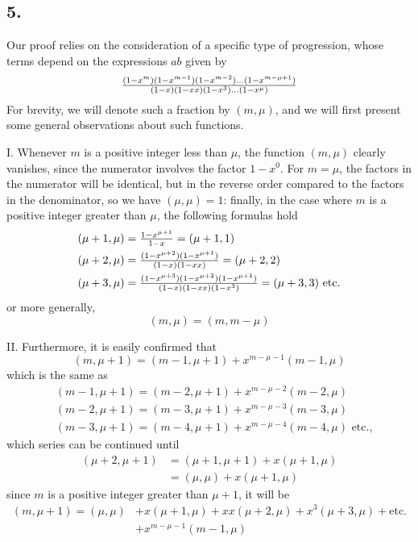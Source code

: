 \documentclass[twoside,12pt, showframe]{memoir}
\let\oldfrac\frac
\def\frac#1#2{\mathchoice{\tfrac{#1}{#2}}{\oldfrac{#1}{#2}}{\genfrac{}{}{}{2}{#1}{#2\mathstrut}}{\genfrac{}{}{}{3}{#1}{#2\mathstrut}}}
\begin{document}
\subsection*{5.}

Our proof relies on the consideration of a specific type of progression, whose terms depend on the expressions \(a b\) given by
\[\frac{(1-x^{m})(1-x^{m-1})(1-x^{m-2}) \ldots(1-x^{m-\mu+1})}{(1-x)(1-x x)(1-x^{3}) \ldots (1-x^{\mu})}\]
For brevity, we will denote such a fraction by \((m, \mu)\), and we will first present some general observations about such functions.
%

I. Whenever \(m\) is a positive integer less than \(\mu\), the function \((m, \mu)\) clearly vanishes, since the numerator involves the factor \(1-x^{0}\). For \(m = \mu\), the factors in the numerator will be identical, but in the reverse order compared to the factors in the denominator, so we have \((\mu, \mu) = 1\): finally, in the case where \(m\) is a positive integer greater than \(\mu\), the following formulas hold
\[\begin{aligned}
& (\mu+1, \mu) = \frac{1-x^{\mu+1}}{1-x} = (\mu+1,1) \\
& (\mu+2, \mu) = \frac{(1-x^{\mu+2})(1-x^{\mu+1})}{(1-x)(1-x x)} = (\mu+2,2) \\
& (\mu+3, \mu) = \frac{(1-x^{\mu+3})(1-x^{\mu+2})(1-x^{\mu+1})}{(1-x)(1-xx)(1-x^{3})} = (\mu+3,3) \text{ etc.}
\end{aligned}\]\clearpage\noindent%
or more generally,
\[(m, \mu) = (m, m-\mu)\]
%

II. Furthermore, it is easily confirmed that
\[(m, \mu+1)=(m-1, \mu+1)+x^{m-\mu-1}(m-1, \mu)\]
which is the same as
\[\begin{aligned}
& (m-1, \mu+1)=(m-2, \mu+1)+x^{m-\mu-2}(m-2, \mu) \\
& (m-2, \mu+1)=(m-3, \mu+1)+x^{m-\mu-3}(m-3, \mu) \\
& (m-3, \mu+1)=(m-4, \mu+1)+x^{m-\mu-4}(m-4, \mu) \text{ etc.,}
\end{aligned}\]
which series can be continued until
\[\begin{aligned}
(\mu+2, \mu+1) & =(\mu+1, \mu+1)+x(\mu+1, \mu) \\
& =(\mu, \mu)+x(\mu+1, \mu)
\end{aligned}\]
since \(m\) is a positive integer greater than \(\mu+1\), it will be
\[\begin{aligned}
(m, \mu+1)=(\mu, \mu) & +x(\mu+1, \mu)+x x(\mu+2, \mu)+x^{3}(\mu+3, \mu)+\text{etc.} \\
& +x^{m-\mu-1}(m-1, \mu)
\end{aligned}\]
%
\end{document}
